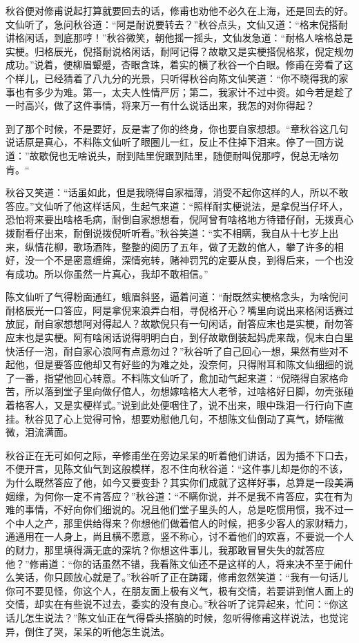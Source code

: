 \documentclass[12pt,UTF8]{ctexbook}
\begin{document}
{{{秋谷便对修甫说起打算就要回去的话，修甫也劝他不必久在上海，还是回去的好。文仙听了，急问秋谷道：“阿是耐说要转去？”秋谷点头，文仙又道：“格末倪搭耐讲格闲话，到底那哼！”秋谷微笑，朝他摇一摇头，文仙发急道：“耐格人啥格总是实梗。归格辰光，倪搭耐说格闲话，耐阿记得？故歇又是实梗搭倪格浆，倪定规勿成功。”说着，便柳眉颦蹙，杏眼含珠，着实的横了秋谷一个白眼。修甫在旁看了这个样儿，已经猜着了八九分的光景，只听得秋谷向陈文仙笑道：“你不晓得我的家事也有多少为难。第一，太夫人性情严厉；第二，我家计不过中资。如今若是趁了一时高兴，做了这件事情，将来万一有什么说话出来，我怎的对你得起？

到了那个时候，不是要好，反是害了你的终身，你也要自家想想。“章秋谷这几句说话原是真心，不料陈文仙听了眼圈儿一红，反止不住掉下泪来。停了一回方说道：”故歇倪也无啥说头，耐到陆里倪跟到陆里，随便耐叫倪那哼，倪总无啥勿肯。“

秋谷又笑道：“话虽如此，但是我晓得自家福薄，消受不起你这样的人，所以不敢答应。”文仙听了他这样话风，生起气来道：“照样耐实梗说法，是拿倪当仔坏人，恐怕将来要出啥格毛病，耐倒自家想想看，倪阿曾有啥格地方待错仔耐，无拨真心拨耐看仔出来，耐倒说拨倪听听看。”秋谷笑道：“实不相瞒，我自从十七岁上出来，纵情花柳，歌场酒阵，整整的阅历了五年，做了无数的倌人，攀了许多的相好，没一个不是密意缠绵，深情宛转，赌神罚咒的定要从良，到得后来，一个也没有成功。所以你虽然一片真心，我却不敢相信。”

陈文仙听了气得粉面通红，蛾眉斜竖，逼着问道：“耐既然实梗格念头，为啥倪问耐格辰光一口答应，阿是拿倪来浪弄白相，寻倪格开心？嘴里向说出来格闲话赛过放屁，耐自家想想阿对得起人？故歇倪只有一句闲话，耐答应末也是实梗，耐勿答应末也是实梗。阿有啥闲话说得明明白白，到仔故歇倒装起妈虎来哉，倪末白白里快活仔一泡，耐自家心浪阿有点意勿过？”秋谷听了自己回心一想，果然有些对不起他，但是要答应他却又有好些的为难之处，没奈何，只得附耳和陈文仙细细的说了一番，指望他回心转意。不料陈文仙听了，愈加动气起来道：“倪晓得自家格命苦，所以落到堂子里向做仔倌人，勿想嫁啥格大人老爷，过啥格好日脚，勿壳张碰着格客人，又是实梗样式。”说到此处便咽住了，说不出来，眼中珠泪一行行向下直挂。秋谷见了心上觉得可怜，想要劝慰他几句，不想陈文仙倒动了真气，娇喘微微，泪流满面。

秋谷正在无可如何之际，辛修甫坐在旁边呆呆的听着他们讲话，因为插不下口去，不便开言，见陈文仙气到这般模样，忍不住向秋谷道：“这件事儿却是你的不该，为什么既然答应了他，如今又要变卦？其实你们成就了这样好事，总算是一段美满姻缘，为何你一定不肯答应？”秋谷道：“不瞒你说，并不是我不肯答应，实在有为难的事情，不好向你们细说的。况且他们堂子里头的人，总是吃惯用惯，我不过一个中人之产，那里供给得来？你想他们做着倌人的时候，把多少客人的家财精力，通通用在一人身上，尚且横不愿意，竖不称心，讨不着他们的欢喜，不要说一个人的财力，那里填得满无底的深坑？你想这件事儿，我那敢冒冒失失的就答应他？”修甫道：“你的话虽然不错，我看陈文仙还不是这样的人，将来决不至于闹什么笑话，你只顾放心就是了。”秋谷听了正在踌躇，修甫忽然笑道：“我有一句话儿你可不要见怪，你这个人，在朋友面上极有义气，极有交情，若要讲到倌人面上的交情，却实在有些说不过去，委实的没有良心。”秋谷听了诧异起来，忙问：“你这话儿怎生说法？”陈文仙正在气得昏头搭脑的时候，忽听得修甫这样说法，也觉诧异，倒住了哭，呆呆的听他怎生说法。

}}}
\end{document}
